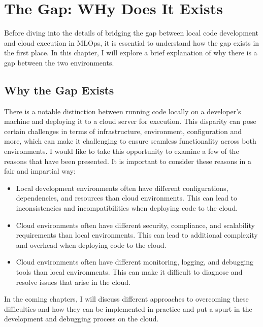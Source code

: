 \chapter{The Gap: WHy Does It Exists}\label{chapter:gap}

Before diving into the details of bridging the gap between local code development
and cloud execution in \ac{MLOps}, it is essential to understand how the gap exists in the first place.
In this chapter, I will explore a brief explanation of why there is a gap between the two environments.

\section{Why the Gap Exists}
There is a notable distinction between running code locally on a developer's machine and deploying it to a cloud server for execution. This disparity can pose certain challenges in terms of infrastructure, environment, configuration and more, which can make it challenging to ensure seamless functionality across both environments.
\newline 
I would like to take this opportunity to examine a few of the reasons that have been presented. It is important to consider these reasons in a fair and impartial way:
\begin{itemize}
    \item Local development environments often have different configurations, dependencies, and resources than cloud environments. This can lead to inconsistencies and incompatibilities when deploying code to the cloud.
    \item Cloud environments often have different security, compliance, and scalability requirements than local environments. This can lead to additional complexity and overhead when deploying code to the cloud.
    \item Cloud environments often have different monitoring, logging, and debugging tools than local environments. This can make it difficult to diagnose and resolve issues that arise in the cloud.
\end{itemize}
In the coming chapters, I will discuss different approaches to overcoming these difficulties and how they
can be implemented in practice and put a spurt in the development and debugging
process on the cloud.


